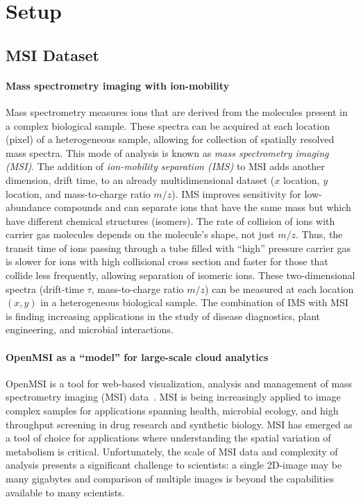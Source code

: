 \section{Setup}
\label{sec:setup}

\subsection{MSI Dataset}
\paragraph{Mass spectrometry imaging with ion-mobility}
Mass spectrometry measures ions that are derived from the molecules present in a complex biological sample.
These spectra can be acquired at each location (pixel) of a heterogeneous sample, allowing for collection of spatially
resolved mass spectra.
This mode of analysis is known as \textit{mass spectrometry imaging (MSI)}.
The addition of \textit{ion-mobility separation (IMS)} to MSI adds another dimension, drift time, to an already multidimensional
dataset ($x$ location, $y$ location, and mass-to-charge ratio $m/z$).
IMS improves sensitivity for low-abundance compounds and can separate ions that have the same mass but which have
different chemical structures (isomers).
The rate of collision of ions with carrier gas molecules depends on the molecule's shape, not just $m/z$.
Thus, the transit time of ions passing through a tube filled with ``high'' pressure carrier gas is slower
for ions with high collisional cross section and faster for those that collide less frequently, allowing separation of
isomeric ions.
These two-dimensional spectra (drift-time $\tau$, mass-to-charge ratio $m/z$) can be measured at each location $(x, y)$ in a
heterogeneous biological sample.
The combination of IMS with MSI is finding increasing applications in the study of disease diagnostics, plant
engineering, and microbial interactions.

\paragraph{OpenMSI as a ``model'' for large-scale cloud analytics}
OpenMSI is a tool for web-based visualization, analysis and
management of mass spectrometry imaging (MSI) data~\cite{OpenMSI}.  MSI is being increasingly applied to image complex samples for
applications spanning health, microbial ecology, and high throughput screening in drug research and synthetic biology.
MSI has emerged as a tool of choice for applications where understanding the spatial variation of metabolism is
critical. Unfortunately, the scale of MSI data and complexity of analysis presents a significant challenge to
scientists: a single 2D-image may be many gigabytes and comparison of multiple images is beyond the capabilities
available to many scientists. 

